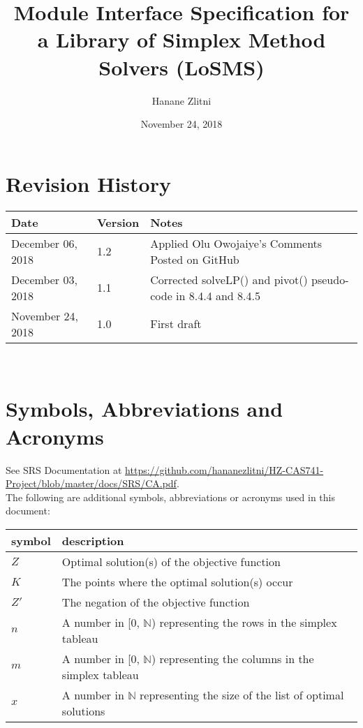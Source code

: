 \documentclass[12pt, titlepage]{article}
\newcommand{\progname}{Library of Simplex Method Solvers}
\newcommand{\famname}{LoSMS}
\begin{document}
\title{Module Interface Specification for a \progname{} (\famname{})}

\author{Hanane Zlitni}

\date{November 24, 2018}

\maketitle


\section{Revision History}

\begin{tabularx}{\textwidth}{p{3cm}p{2cm}X}
\toprule {\bf Date} & {\bf Version} & {\bf Notes}\\
\midrule
December 06, 2018 & 1.2 & Applied Olu Owojaiye's Comments Posted on GitHub\\
December 03, 2018 & 1.1 & Corrected solveLP() and pivot() pseudo-code in 8.4.4 
and 8.4.5\\
November 24, 2018 & 1.0 & First draft\\
\bottomrule
\end{tabularx}

~\newpage

\section{Symbols, Abbreviations and Acronyms}

See SRS Documentation at 
\url{https://github.com/hananezlitni/HZ-CAS741-Project/blob/master/docs/SRS/CA.pdf}.
 \\

The following are additional symbols, abbreviations or acronyms used in this 
document: \\

\renewcommand{\arraystretch}{1.2}
\begin{tabular}{l l} 
	\toprule		
	\textbf{symbol} & \textbf{description}\\
	\midrule 
	$Z$ & Optimal solution(s) of the objective function\\
	$K$ & The points where the optimal solution(s) occur\\
	$Z'$ & The negation of the objective function\\
	$n$ & A number in [0, $\mathbb{N}$) representing the rows in the simplex 
	tableau \\
	$m$ & A number in [0, $\mathbb{N}$) representing the columns in the 
	simplex tableau \\
	$x$ & A number in $\mathbb{N}$ representing the size of the list of 
	optimal solutions \\
	\bottomrule
\end{tabular}\\
\end{document}
